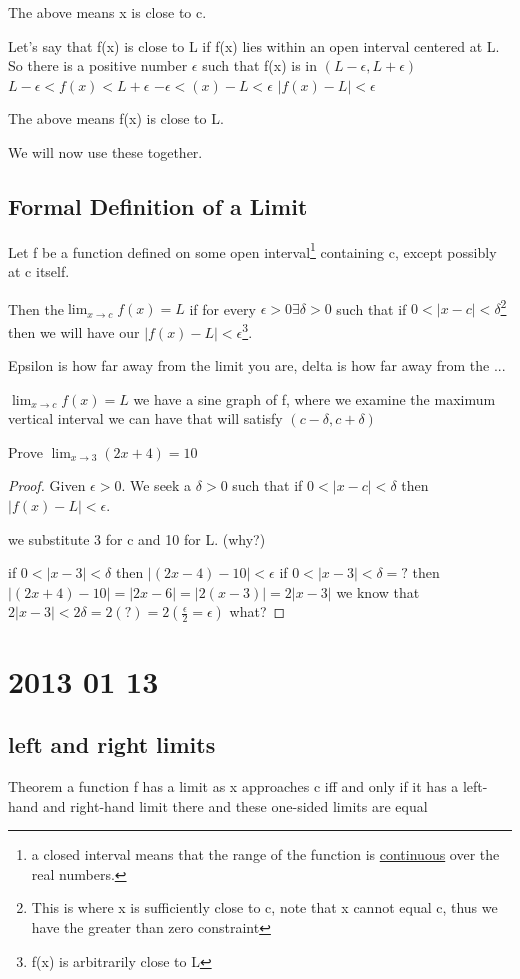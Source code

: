 \documentclass[12pt]{article}
\begin{document}
The above means x is close to c.


Let's say that f(x) is close to L if f(x) lies within an open interval centered at L. So there is a positive
number $\epsilon$ such that f(x) is in $(L-\epsilon{},L+\epsilon{})$
$
L-\epsilon < f(x) < L + \epsilon
$
$-\epsilon < (x) -L < \epsilon$
$|f(x)-L| < \epsilon$

The above means f(x) is close to L.

We will now use these together.

\subsection{Formal Definition of a Limit}
Let f be a function defined on some open interval\footnote{a closed interval means that the range of the
  function is \underline{continuous} over the real numbers.} containing c, except possibly at c itself.

Then the$\lim_{x \to c} f(x) = L$ if for every $\epsilon > 0 \exists \delta > 0$ such that if $0 < |x-c| <
\delta{}$\footnote{This is where x is sufficiently close to c, note that x cannot equal c, thus we have the
  greater than zero constraint} then we will have our $|f(x)-L| < \epsilon $\footnote{f(x) is arbitrarily close to L}.

Epsilon is how far away from the limit you are, delta is how far away from the ...


$\lim_{x \to c}f(x) = L$ we have a sine graph of f, where we examine the maximum vertical interval we can have
that will satisfy $(c- \delta,c + \delta)$

Prove $\lim_{x \to 3}(2x +4) = 10$

\begin{proof}
Given $\epsilon > 0$. We seek a $\delta > 0$ such that if $0 < |x-c| < \delta$ then $|f(x)-L|< \epsilon$.

we substitute 3 for c and 10 for L. (why?)

if $0 < |x-3| < \delta$ then $|(2x-4)-10|< \epsilon$
if $0 < |x-3| < \delta = ?$ then $|(2x+4)-10| = |2x-6| = |2(x-3)| = 2|x-3| $
we know that $ 2|x-3| < 2 \delta = 2(?) = 2(\frac{\epsilon}{2} = \epsilon)$ what?
\end{proof}

\section{2013 01 13}
\subsection{left and right limits}
Theorem a function f has a limit as x approaches c iff and only if it has a left-hand and right-hand limit
there and these one-sided limits are equal
\end{document}
